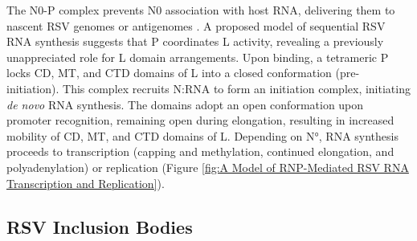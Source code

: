 The N0-P complex prevents N0 association with host RNA, delivering them to nascent RSV genomes or antigenomes \cite{Castagne2004BiochemicalDomain, Galloux2015IdentificationNucleoprotein}. A proposed model of sequential RSV RNA synthesis suggests that P coordinates L activity, revealing a previously unappreciated role for L domain arrangements. Upon binding, a tetrameric P locks CD, MT, and CTD domains of L into a closed conformation (pre-initiation). This complex recruits N:RNA to form an initiation complex, initiating \textit{de novo} RNA synthesis. The domains adopt an open conformation upon promoter recognition, remaining open during elongation, resulting in increased mobility of CD, MT, and CTD domains of L. Depending on N°, RNA synthesis proceeds to transcription (capping and methylation, continued elongation, and polyadenylation) or replication \cite{Cao2020Cryo-EMPolymerase} (Figure \ref{fig:A Model of RNP-Mediated RSV RNA Transcription and Replication}).

\subsection{RSV Inclusion Bodies} \label{subsec:RSV Inclusion Bodies}




